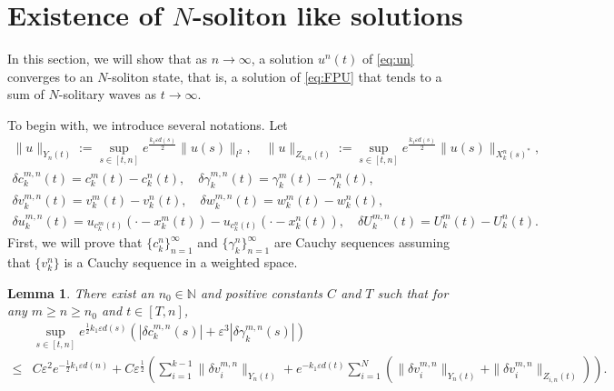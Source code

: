 \documentclass[11pt]{amsart}
\newtheorem{lemma}[theorem]{Lemma}
\theoremstyle{remark}
\numberwithin{equation}{section}
\begin{document}
\section{Existence of $N$-soliton like solutions}
\label{sec:existence}
In this section, we will show that as $n\to\infty$, a solution $u^n(t)$ of
\eqref{eq:un} converges to an $N$-soliton state, that is,
a solution of \eqref{eq:FPU} that tends to a sum of $N$-solitary waves as
$t\to\infty$.
\par
To begin with, we introduce several notations. Let
\begin{gather*}
\|u\|_{Y_n(t)}:=\sup_{s\in[t,n]}e^{\frac{k_1{\varepsilon} d(s)}2}\|u(s)\|_{l^2},
\quad 
\|u\|_{Z_{k,n}(t)}:=\sup_{s\in[t,n]}e^{\frac{k_1{\varepsilon} d(s)}2}\|u(s)\|_{X_k^n(s)^*},\\
{\delta c}_k^{m,n}(t)=c_k^m(t)-c_k^n(t),\quad {\delta\gamma}_k^{m,n}(t)=\gamma_k^m(t)-\gamma_k^n(t),\\
{\delta v}_k^{m,n}(t)=v_k^m(t)-v_k^n(t),\quad {\delta w}_k^{m,n}(t)=w_k^m(t)-w_k^n(t),\\
{\delta u}_k^{m,n}(t)=u_{c_k^m(t)}(\cdot-x_k^m(t))-u_{c_k^n(t)}(\cdot-x_k^n(t)),
\quad {\delta U}_k^{m,n}(t)=U_k^m(t)-U_k^n(t).
\end{gather*}
First, we will prove that $\{c_k^n\}_{n=1}^\infty$ and $\{\gamma_k^n\}_{n=1}^\infty$
are Cauchy sequences assuming that $\{v_k^n\}$ is a Cauchy sequence in 
a weighted space.
\begin{lemma}
  \label{lem:cauchyxc}
There exist an $n_0\in{\mathbb{N}}$ and positive constants $C$ and $T$ such that for any
$m\ge n\ge n_0$ and  $t\in [T,n]$,
\begin{align*}
& \sup_{s\in[t,n]}e^{\frac12k_1{\varepsilon} d(s)}(|{\delta c}^{m,n}_k(s)|+{\varepsilon}^3|{\delta\gamma}^{m,n}_k(s)|)
\\ \le  & C{\varepsilon}^2e^{-\frac12k_1{\varepsilon} d(n)}+
C{\varepsilon}^{\frac12}\left(\sum_{i=1}^{k-1}\|{\delta v}_i^{m,n}\|_{Y_n(t)}
+e^{-k_1{\varepsilon} d(t)}\sum_{i=1}^N(\|{\delta v}_i^{m,n}\|_{Y_n(t)}+\|{\delta v}_i^{m,n}\|_{Z_{i,n}(t)})\right).
\end{align*}
\end{lemma}
\end{document}
